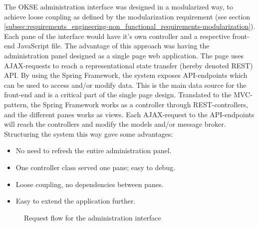 The OKSE administration interface was designed in a modularized way, to achieve loose coupling as defined by the modularization requirement (see section  \ref{subsec:requirements_engineering-non_functional_requirements-modularization}). Each pane of the interface would have it's own controller and a respective front-end JavaScript file. The advantage of this approach was having the administration panel designed as a single page web application. The page uses AJAX-requests to reach a representational state transfer (hereby denoted REST) API. By using the Spring Framework, the system exposes API-endpoints which can be used to access and/or modify data. This is the main data source for the front-end and is a critical part of the single page design. Translated to the MVC-pattern, the Spring Framework works as a controller through REST-controllers, and the different panes works as views. Each AJAX-request to the API-endpoints will reach the controllers and modify the models and/or message broker. Structuring the system this way gave some advantages: 

\begin{itemize}
    \item No need to refresh the entire administration panel.
    \item One controller class served one pane; easy to debug.
    \item Loose coupling, no dependencies between panes.
    \item Easy to extend the application further.
\end{itemize}

\begin{center}
  \begin{figure}[ht!]
    \caption{Request flow for the administration interface}
    \label{fig:oac-request-flow}
  \end{figure}
\end{center}

